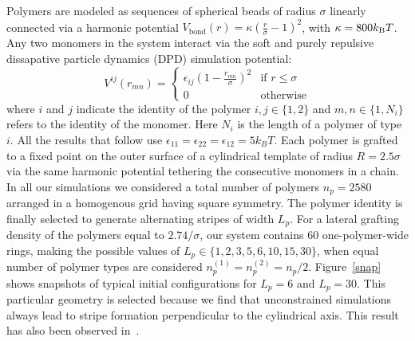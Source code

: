 Polymers are modeled as  sequences of spherical beads of radius $\sigma$ linearly connected via a harmonic potential $V_{\textrm{bond}}(r) = \kappa \left(\frac{r}{\sigma}-1\right)^2$, with $\kappa = 800 k_{\rm B}T$.
Any two monomers in the system interact 
via the soft and purely repulsive dissapative particle dynamics (DPD) simulation potential:
\begin{equation}
V^{ij}(r_{mn}) = 
	\begin{cases}
		\epsilon_{ij} \left(1-\frac{r_{mn}}{\sigma}\right)^2 & \textrm{if $r \leq \sigma$} \\
		0 & \textrm{otherwise}
	\end{cases}
\end{equation}
where $i$ and $j$ indicate the identity of the polymer $i,j \in\{1,2\}$ and $m,n \in\{1,N_i\}$ refers to the identity of the monomer. 
Here $N_i$ is the length of a polymer of type $i$. 
All the results that follow use $\epsilon_{11} = \epsilon_{22} = \epsilon_{12} = 5 k_BT$.
Each polymer is grafted to a fixed point on the outer surface of a cylindrical template of  radius $R=2.5\sigma$ via the same harmonic potential tethering the consecutive monomers in a chain. In all our simulations we considered a total number of polymers $n_p=2580$ arranged in a homogenous grid having square symmetry. The polymer identity is finally selected to generate alternating stripes of  width $L_p$.
For a lateral grafting density of the polymers equal to $2.74/\sigma$, our system contains $60$ one-polymer-wide rings, making the possible values of $L_p\in \{1, 2, 3, 5, 6, 10, 15, 30\}$, when equal number of polymer types are considered $n_p^{(1)}=n_p^{(2)}=n_p/2$. Figure~\ref{snap} shows snapshots of typical initial configurations 
for $L_p=6$ and $L_p=30$. This particular geometry is selected because we find that unconstrained simulations always lead to stripe formation perpendicular to the cylindrical axis. This result has also been observed  
in~\cite{Stellacci6}.
 
